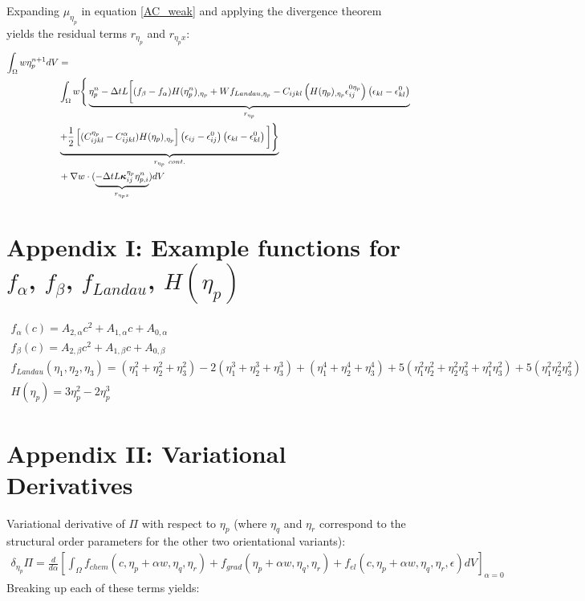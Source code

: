 \documentclass[11pt]{article}
\renewcommand{\=}[1]{\stackrel{#1}{=}} %
\theoremstyle{definition}
\theoremstyle{remark}
\def\Bkappa{\mbox{\boldmath$\kappa$}}
\begin{document}
Expanding $\mu_{\eta_p}$ in equation \ref{AC_weak} and applying the divergence theorem yields the residual terms $r_{\eta_p}$ and $r_{\eta_p x}$:
\begin{equation}
\begin{split}
\int_\Omega w \eta_p^{n+1} dV &= \\
&\int_\Omega w \Bigg\{\underbrace{\eta_p^{n}-\Delta t L \bigg[(f_{\beta}-f_{\alpha})H(\eta_p^n)_{,\eta_p} + W f_{Landau,\eta_p} - C_{ijkl} \left( H(\eta_p)_{,\eta_p} \epsilon_{ij}^{0 \eta_p}\right)\left(\epsilon_{kl} - \epsilon_{kl}^{0} \right) }_{r_{\eta_p}} \\
&\underbrace{+ \frac{1}{2} \left[ (C_{ijkl}^{\eta_p} - C_{ijkl}^{\alpha}) H(\eta_p)_{,\eta_p} \right] \left(\epsilon_{ij} - \epsilon_{ij}^{0} \right) \left(\epsilon_{kl} - \epsilon_{kl}^{0} \right) \bigg] \Bigg\}}_{r_{\eta_p}~cont.}  \\
&+ \nabla w \cdot (\underbrace{-\Delta t  L \Bkappa^{\eta_p}_{ij} \eta_{p,i}^n}_{r_{\eta_p x}} ) dV 
\end{split}
\end{equation}

\section{Appendix I: Example functions for $f_{\alpha}$, $f_{\beta}$, $f_{Landau}$, $H(\eta_p)$ }
\begin{gather}
f_{\alpha}(c) = A_{2, \alpha} c^2 + A_{1, \alpha} c + A_{0, \alpha} \\
f_{\beta}(c) = A_{2, \beta} c^2 + A_{1, \beta} c + A_{0, \beta} \\
f_{Landau}(\eta_1, \eta_2, \eta_3) = (\eta_1^2 + \eta_2^2 + \eta_3^2) - 2(\eta_1^3 + \eta_2^3 + \eta_3^3) +  (\eta_1^4 + \eta_2^4 + \eta_3^4) + 5 (\eta_1^2 \eta_2^2 + \eta_2^2 \eta_3^2 + \eta_1^2 \eta_3^2) +  5(\eta_1^2 \eta_2^2 \eta_3^2) \\
H(\eta_p) = 3 \eta_p^2 - 2 \eta_p^3
\end{gather}

\section{Appendix II: Variational Derivatives}
Variational derivative of $\Pi$ with respect to $\eta_p$ (where $\eta_q$ and $\eta_r$ correspond to the structural order parameters for the other two orientational variants):
\begin{gather}
\delta_{\eta_p} \Pi  =  \frac{d}{d\alpha} \left[\int_{\Omega}  f_{chem}(c,\eta_p+\alpha w,\eta_q,\eta_r) + f_{grad}(\eta_p+\alpha w,\eta_q,\eta_r) + f_{el}(c,\eta_p+\alpha w,\eta_q,\eta_r,\epsilon) dV  \right]_{\alpha=0}
\end{gather}
Breaking up each of these terms yields:
\end{document}
